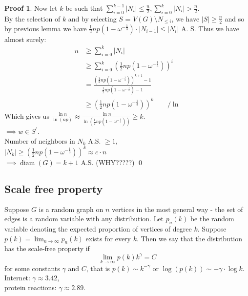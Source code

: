 \documentclass[a4paper, 12pt]{book}
\theoremstyle{definition}
\newtheorem{pro}[counter]{Proof}
\theoremstyle{remark}
\DeclareMathOperator{\diam}{diam}
\begin{document}
\begin{pro}
  Now let $k$ be such that $\sum_{i=0}^{k-1} |N_i| \leq \frac{n}{2}, \sum_{i=0}^{k} |N_i| > \frac{n}{2}$. \\
  By the selection of $k$ and by selecting $S$ = $V(G) \setminus N_{\leq i}$, we have $|S| \geq \frac{n}{2}$ and so by previous lemma we have $\frac{1}{2} n p \left(1-\omega^{-\frac{1}{3}}\right) \cdot |N_{i-1}| \leq |N_i|$ A. S. Thus we have almost surely:
  \begin{align*}
    n & \geq \sum_{i=0}^{k} |N_i| \\
    & \geq \sum_{i=0}^{k} \left(\frac{1}{2} n p \left(1-\omega^{-\frac{1}{3}}\right)\right)^i \\
    &= \frac{\left(\frac{1}{2} n p \left(1-\omega^{-\frac{1}{3}}\right)\right)^{k+1} - 1}
      {\frac{1}{2} n p \left(1-\omega^{-\frac{1}{3}}\right) - 1} \\
    &\geq \left(\frac{1}{2} n p \left(1-\omega^{-\frac{1}{3}}\right)\right)^k \qquad / \ln
  \end{align*}
  Which gives us $\frac{\ln n}{\ln (np)} \approx \frac{\ln n}{\ln \left(\frac{1}{2} n p \left(1-\omega^{-\frac{1}{3}}\right)\right)} \geq k$. \\
  $\implies w \in S^{'}$. \\
  Number of neighbors in $N_k$ A.S. $\geq 1$, \\
  $|N_k| \geq \left(\frac{1}{2} n p \left(1-\omega^{-\frac{1}{3}}\right)\right)^k \approx c \cdot n$ \\
  $\implies \diam (G) = k + 1 $ A.S. (WHY?????)
  \qed
\end{pro}

\subsection{Scale free property}

Suppose $G$ is a random graph on $n$ vertices in the most general way - the set of edges is a random variable with any distribution. Let $p_n(k)$ be the random
variable denoting the expected proportion of vertices of degree $k$. Suppose $p(k) = \lim_{n\to \infty}p_n(k)$ exists for every $k$. Then we say that the distribution has the scale-free property if 
$$\lim_{k\to \infty}p(k)k^{\gamma} = C$$
for some constants $\gamma$ and $C$, that is $p(k) \sim k^{-\gamma}$ or $\log(p(k)) \sim -\gamma \cdot \log k$.\\
Internet: $\gamma \approx 3.42$, \\
protein reactions: $\gamma \approx 2.89$.
\end{document}

